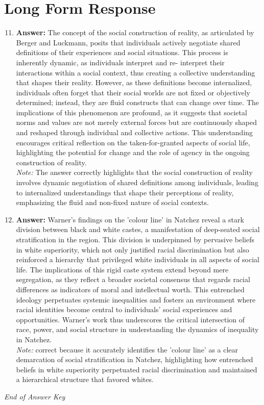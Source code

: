 \documentclass[12pt]{article}
\begin{document}
\section*{Long Form Response}
\begin{enumerate}[label=\arabic*.]
\setcounter{enumi}{10}
\item \textbf{Answer:} The concept of the social construction of reality, as articulated by Berger and Luckmann, posits that individuals actively negotiate shared definitions of their experiences and social situations. This process is inherently dynamic, as individuals interpret and re- interpret their interactions within a social context, thus creating a collective understanding that shapes their reality. However, as these definitions become internalized, individuals often forget that their social worlds are not fixed or objectively determined; instead, they are fluid constructs that can change over time. The implications of this phenomenon are profound, as it suggests that societal norms and values are not merely external forces but are continuously shaped and reshaped through individual and collective actions. This understanding encourages critical reflection on the taken-for-granted aspects of social life, highlighting the potential for change and the role of agency in the ongoing construction of reality.
\\ \textit{Note:} The answer correctly highlights that the social construction of reality involves dynamic negotiation of shared definitions among individuals, leading to internalized understandings that shape their perceptions of reality, emphasizing the fluid and non-fixed nature of social contexts.
\item \textbf{Answer:} Warner's findings on the 'colour line' in Natchez reveal a stark division between black and white castes, a manifestation of deep-seated social stratification in the region. This division is underpinned by pervasive beliefs in white superiority, which not only justified racial discrimination but also reinforced a hierarchy that privileged white individuals in all aspects of social life. The implications of this rigid caste system extend beyond mere segregation, as they reflect a broader societal consensus that regards racial differences as indicators of moral and intellectual worth. This entrenched ideology perpetuates systemic inequalities and fosters an environment where racial identities become central to individuals' social experiences and opportunities. Warner's work thus underscores the critical intersection of race, power, and social structure in understanding the dynamics of inequality in Natchez.
\\ \textit{Note:} correct because it accurately identifies the 'colour line' as a clear demarcation of social stratification in Natchez, highlighting how entrenched beliefs in white superiority perpetuated racial discrimination and maintained a hierarchical structure that favored whites.
\end{enumerate}

\vfill
\noindent\textit{End of Answer Key}
\end{document}

